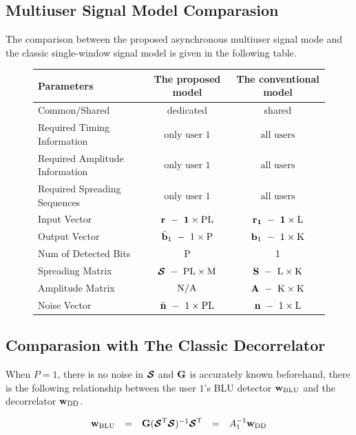 \documentclass[a4paper,10pt,fleqn, twocolumn]{IEEETran}
\newcommand{\bb}{{\bf b}}
\newcommand{\bG}{{\bf G}}
\newcommand{\bn}{{\bf n}}
\newcommand{\bw}{{\bf w}}
\newcommand{\bS}{{\bf S}}
\newcommand{\bcS}{{\mbox {\boldmath ${\cal S}$}}}
\begin{document}
\subsection{Multiuser Signal Model Comparasion}
The comparison between the proposed asynchronous multiuser signal
mode and the classic single-window signal model is given in the
following table.
\begin{figure}[t]\label{ModelComp}
\begin{center}
\center{}
\begin{tabular}{lcc}
Parameters&The proposed model&The conventional model\\
\hline
Common/Shared& dedicated& shared\\
Required Timing Information&$\mbox{only user 1}$ & $\mbox{all users}$\\
Required Amplitude Information&$\mbox{only user 1}$ & $\mbox{all users}$\\
Required Spreading Sequences&$\mbox{only user 1}$ & $\mbox{all users}$\\
 \hline
Input Vector&$\bf{r}\ -\ 1\times\rm PL$&$\bf{r}_1\ -\ 1\times\rm L$\\
Output Vector &$\bar\bb_1\ -\ 1\times\rm P$&$\bb_1\ -\ 1\times\rm K$\\
Num of Detected Bits& P & 1\\
Spreading Matrix &$\bcS\ -\ \rm PL\times\rm M$&$\bS\ -\ \rm L\times\rm K$\\
Amplitude Matrix &$\rm N/A$&$\bf{A}\ -\ \rm K\times\rm K$\\
Noise Vector &$\bar\bn\ -\ 1\times\rm PL$&$\bn\ -\
1\times\rm L$\\

 \hline
\end{tabular}
\end{center}
\end{figure}

\subsection{Comparasion with The Classic Decorrelator}

When $P=1$, there is no noise in $\bcS$ and $\bG$ is accurately
known beforehand, there is the following relationship between the
user $1$'s BLU detector $\bw_{\rm BLU}$ and the decorrelator
$\bw_{\rm DD}$.

\begin{equation}
\begin{array}{rcccl}
\bw_{\rm BLU}&=&\bG(\bcS^{\rm T}\bcS)^{-1}\bcS^{\rm
T}&=&A_1^{-1}\bw_{\rm DD}
\end{array}
\end{equation} \label{wN0}
\end{document}
